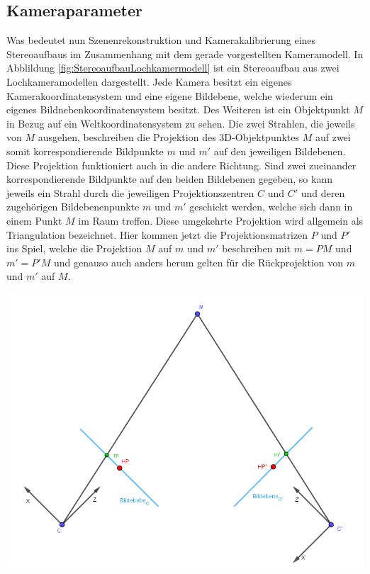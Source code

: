 \subsection{Kameraparameter}

Was bedeutet nun Szenenrekonstruktion und Kamerakalibrierung eines Stereoaufbaus im Zusammenhang mit dem gerade vorgestellten Kameramodell. In Abblildung \ref{fig:StereoaufbauLochkamermodell} ist ein Stereoaufbau aus zwei Lochkameramodellen dargestellt. Jede Kamera besitzt ein eigenes Kamerakoordinatensystem und eine eigene Bildebene, welche wiederum ein eigenes Bildnebenkoordinatensystem besitzt. Des Weiteren ist ein Objektpunkt $M$ in Bezug auf ein Weltkoordinatensystem zu sehen. Die zwei Strahlen, die jeweils von $M$ ausgehen, beschreiben die Projektion des 3D-Objektpunktes $M$ auf zwei somit korrespondierende Bildpunkte $m$ und $m'$ auf den jeweiligen Bildebenen. Diese Projektion funktioniert auch in die andere Richtung. Sind zwei zueinander korrespondierende Bildpunkte auf den beiden Bildebenen gegeben, so kann jeweils ein Strahl durch die jeweiligen Projektionszentren $C$ und $C'$ und deren zugehörigen Bildebenenpunkte $m$ und $m'$ geschickt werden, welche sich dann in einem Punkt $M$ im Raum treffen. Diese umgekehrte Projektion  wird allgemein als Triangulation bezeichnet\cite{HZ}. Hier kommen jetzt die Projektionsmatrizen $P$ und $P'$ ins Spiel, welche die Projektion $M$ auf $m$ und $m'$ beschreiben mit $m = PM$ und $m' = P'M$ und genauso auch anders herum gelten für die Rückprojektion von $m$ und $m'$ auf $M$\cite{CamerModels.,HZ}.\\


	\begin{minipage}{\linewidth}
	\centering
	\includegraphics[width=.8\linewidth]{images/StereokopischerAufbauLochKamerModell.png}
	\label{fig:StereoaufbauLochkamermodell}
\end{minipage}\\

